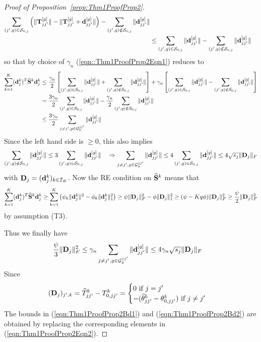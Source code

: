 \begin{proof}[Proof of Proposition~\ref{prop:Thm1ProofProp2}]
\begin{align*}
\sum_{(j',g) \in {\cal{S}}_{0,j}} \left( \| {\mathbf{T}}_{jj'}^{[g]} \| -  \| {\mathbf{T}}_{jj'}^{[g]} + {\bf{d}}_{jj'}^{[g]}\| \right) -
\sum_{(j',g) \notin {\cal{S}}_{0,j}} \| {\bf{d}}_{jj'}^{[g]} \|\\
& \leq \sum_{(j',g) \in {\cal{S}}_{0,j}} \| {\bf{d}}_{jj'}^{[g]} \| - \sum_{(j',g) \notin {\cal{S}}_{0,j}} \| {\bf{d}}_{jj'}^{[g]} \|
\end{align*}
so that by choice of $\gamma_n$ (\ref{eqn::Thm1ProofProp2Eqn1}) reduces to
%
\begin{align}\label{eqn:Thm1ProofProp2Eqn3}
\sum_{k=1}^K ({\bf{d}}_j^k)^T \widehat {{\mathbf{S}}}^k {\bf{d}}_j^k & \leq 
\frac{\gamma_n}{2} \left[ \sum_{(j',g) \in {\cal{S}}_{0,j}} \| {\bf{d}}_{jj'}^{[g]} \| + \sum_{(j',g) \notin {\cal{S}}_{0,j}} \| {\bf{d}}_{jj'}^{[g]} \| \right] +
\gamma_n \left[ \sum_{(j',g) \in {\cal{S}}_{0,j}} \| {\bf{d}}_{jj'}^{[g]} \| - \sum_{(j',g) \notin {\cal{S}}_{0,j}} \| {\bf{d}}_{jj'}^{[g]} \| \right] \notag\\
& = \frac{3 \gamma_n}{2} \sum_{(j',g) \in {\cal{S}}_{0,j}} \| {\bf{d}}_{jj'}^{[g]} \| - \frac{\gamma_n}{2} \sum_{(j',g) \notin {\cal{S}}_{0,j}} \| {\bf{d}}_{jj'}^{[g]} \| \notag\\
& \leq \frac{3 \gamma_n}{2} \sum_{j \neq j', g \in {\cal{G}}_y^{jj'}} \| {\bf{d}}_{jj'}^{[g]} \|
\end{align}
%
Since the left hand side is $\geq 0$, this also implies
%
$$
\sum_{(j',g) \notin {\cal{S}}_{0,j}} \| {\bf{d}}_{jj'}^{[g]} \| \leq 3 \sum_{(j',g) \in {\cal{S}}_{0,j}} \| {\bf{d}}_{jj'}^{[g]} \| \quad \Rightarrow
\sum_{j \neq j', g \in {\cal{G}}_y^{jj'}} \| {\bf{d}}_{jj'}^{[g]} \| \leq
4 \sum_{(j',g) \in {\cal{S}}_{0,j}} \| {\bf{d}}_{jj'}^{[g]} \| \leq 4 \sqrt{s_j} \| {\mathbf{D}}_j \|_F
$$
% 
with ${\mathbf{D}}_j = ({\bf{d}}_j^k)_{k \in {\cal{I}}_K}$. Now the RE condition on $\widehat {{\mathbf{S}}}^k$ means that
%
$$
\sum_{k=1}^K ({\bf{d}}_j^k)^T \widehat {{\mathbf{S}}}^k {\bf{d}}_j^k \geq 
\sum_{k=1}^K \left( \psi_k \| {\bf{d}}_j^k \|^2 - \phi_k \| {\bf{d}}_j^k \|_1^2 \right) \geq
\psi \| {\mathbf{D}}_j \|_F^2 - \phi \| {\mathbf{D}}_j \|_1^2 \geq 
(\psi - Kq \phi ) \| {\mathbf{D}}_j \|_F^2 \geq \frac{\psi}{2}  \| {\mathbf{D}}_j \|_F^2
$$
%
by assumption (T3).

Thus we finally have
%
\begin{align}\label{eqn:Thm1ProofProp2Eqn2}
\frac{\psi}{3} \| {\mathbf{D}}_j \|_F^2 & \leq
\gamma_n \sum_{j \neq j', g \in {\cal{G}}_y^{jj'}} \| {\bf{d}}_{jj'}^{[g]} \| \leq
4 \gamma_n \sqrt{s_j} \| {\mathbf{D}}_j\|_F
\end{align}
%
Since
%
$$
({\mathbf{D}}_j)_{j',k} = \widehat T_{jj'}^k - T_{0,jj'}^k = \begin{cases}
0 \text{ if } j = j'\\
-(\widehat \theta_{jj'}^k - \theta_{0,jj'}^k ) \text{ if } j \neq j'
\end{cases}
$$
%
The bounds in (\ref{eqn:Thm1ProofProp2Bd1}) and (\ref{eqn:Thm1ProofProp2Bd2}) are obtained by replacing the corresponding elements in (\ref{eqn:Thm1ProofProp2Eqn2}).


\end{proof}
